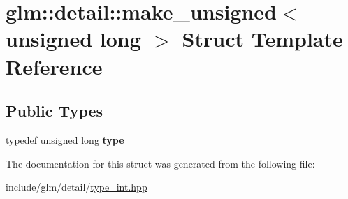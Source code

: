 \hypertarget{structglm_1_1detail_1_1make__unsigned_3_01unsigned_01long_01_4}{}\section{glm\+:\+:detail\+:\+:make\+\_\+unsigned$<$ unsigned long $>$ Struct Template Reference}
\label{structglm_1_1detail_1_1make__unsigned_3_01unsigned_01long_01_4}
\subsection*{Public Types}
\begin{DoxyCompactItemize}
\item 
\mbox{\label{structglm_1_1detail_1_1make__unsigned_3_01unsigned_01long_01_4_a8894ccd179135bda131b42cf10e58362}} 
typedef unsigned long {\bfseries type}
\end{DoxyCompactItemize}


The documentation for this struct was generated from the following file\+:\begin{DoxyCompactItemize}
\item 
include/glm/detail/\hyperlink{type__int_8hpp}{type\+\_\+int.\+hpp}\end{DoxyCompactItemize}
